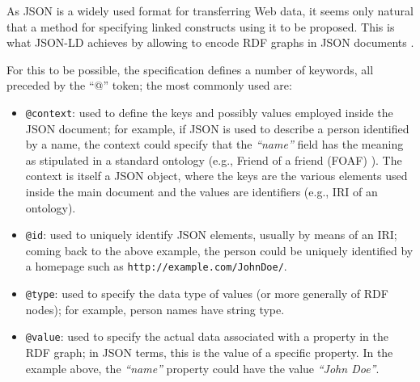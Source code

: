 
As JSON is a widely used format for transferring Web data, it seems only
natural that a method for specifying linked constructs using it to be proposed.
This is what JSON-LD achieves by allowing to encode RDF graphs in JSON
documents \cite{ref:jsonld}.

For this to be possible, the specification defines a number of keywords, all
preceded by the ``@'' token; the most commonly used are:
\begin{itemize}
  \item \texttt{@context}: used to define the keys and possibly values employed
                           inside the JSON document; for example, if JSON
                           is used to describe a person identified by a name,
                           the context could specify that the \textit{``name''}
                           field has the meaning as stipulated in a standard
                           ontology (e.g., Friend of a friend
                           (FOAF) \cite{ref:foaf}). The context is itself a JSON
                           object, where the keys are the various elements used
                           inside the main document and the values are
                           identifiers (e.g., IRI of an ontology).
  \item \texttt{@id}: used to uniquely identify JSON elements, usually by
                      means of an IRI; coming back to the above example, the
                      person could be uniquely identified by a homepage such as
                      \texttt{http://example.com/JohnDoe/}.
  \item \texttt{@type}: used to specify the data type of values (or more
                        generally of RDF nodes); for example, person names have
                        string type.
  \item \texttt{@value}: used to specify the actual data associated with a
                         property in the RDF graph; in JSON terms, this is the
                         value of a specific property. In the example above, the
                         \textit{``name''} property could have the value
                         \textit{``John Doe''}.
\end{itemize}

\newpage

